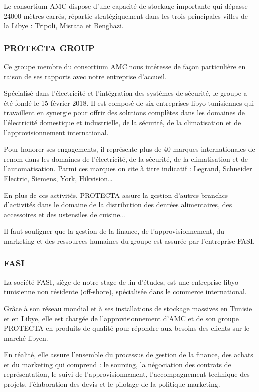\documentclass[a4paper,12pt]{report}
\begin{document}
Le consortium AMC dispose d'une capacité de stockage importante qui dépasse 24000 mètres carrés, répartie stratégiquement dans les trois principales villes de la Libye : Tripoli, Misrata et Benghazi.

\subsubsection{PROTECTA GROUP}

Ce groupe membre du consortium AMC nous intéresse de façon particulière en raison de ses rapports avec notre entreprise d'accueil.

Spécialisé dans l'électricité et l'intégration des systèmes de sécurité, le groupe a été fondé le 15 février 2018. Il est composé de six entreprises libyo-tunisiennes qui travaillent en synergie pour offrir des solutions complètes dans les domaines de l'électricité domestique et industrielle, de la sécurité, de la climatisation et de l'approvisionnement international.

Pour honorer ses engagements, il représente plus de 40 marques internationales de renom dans les domaines de l'électricité, de la sécurité, de la climatisation et de l'automatisation. Parmi ces marques on cite à titre indicatif : Legrand, Schneider Electric, Siemens, York, Hikvision…

En plus de ces activités, PROTECTA assure la gestion d'autres branches d'activités dans le domaine de la distribution des denrées alimentaires, des accessoires et des ustensiles de cuisine...

Il faut souligner que la gestion de la finance, de l'approvisionnement, du marketing et des ressources humaines du groupe est assurée par l'entreprise FASI.

\subsubsection{FASI}

La société FASI, siège de notre stage de fin d'études, est une entreprise libyo-tunisienne non résidente (off-shore), spécialisée dans le commerce international.

Grâce à son réseau mondial et à ses installations de stockage massives en Tunisie et en Libye, elle est chargée de l'approvisionnement d'AMC et de son groupe PROTECTA en produits de qualité pour répondre aux besoins des clients sur le marché libyen.

En réalité, elle assure l'ensemble du processus de gestion de la finance, des achats et du marketing qui comprend : le sourcing, la négociation des contrats de représentation, le suivi de l'approvisionnement, l'accompagnement technique des projets, l'élaboration des devis et le pilotage de la politique marketing.
\end{document}
